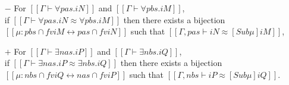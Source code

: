 \begin{lemma}
  \label{lemma:poly-types-equivalence}
  \hfill
  \begin{itemize}
    \item[$-$] For $[[Γ ⊢ ∀pas.iN]]$ and $[[Γ ⊢ ∀pbs.iM]]$,\\ if $[[Γ ⊢ ∀pas.iN ≈ ∀pbs.iM ]]$
    then there exists a bijection $[[μ : {pbs} ∩ fv iM ↔ {pas} ∩ fv iN]]$
    such that $[[ Γ, pas ⊢ iN ≈ [Sub μ] iM ]]$,
    \item[$+$] For $[[Γ ⊢ ∃nas.iP]]$ and $[[Γ ⊢ ∃nbs.iQ]]$,\\  if $[[Γ ⊢ ∃nas.iP ≈ ∃nbs.iQ ]]$
    then there exists a bijection $[[μ : {nbs} ∩ fv iQ ↔ {nas} ∩ fv iP]]$
    such that $[[ Γ, nbs ⊢ iP ≈ [Sub μ] iQ ]]$.
  \end{itemize}
\end{lemma}
